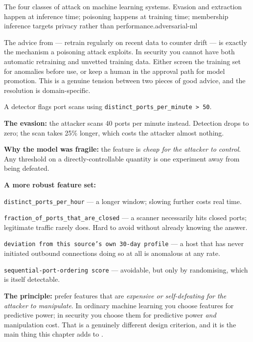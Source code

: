 {The four classes of attack on machine learning systems. Evasion and extraction happen at
inference time; poisoning happens at training time; membership inference targets privacy
rather than performance.}{adversarial-ml}

\begin{alertbox}
The advice from  --- retrain regularly on recent data to counter drift
--- is exactly the mechanism a poisoning attack exploits. In security you cannot
have both automatic retraining and unvetted training data. Either screen the
training set for anomalies before use, or keep a human in the approval path for
model promotion. This is a genuine tension between two pieces of good advice, and
the resolution is domain-specific.
\end{alertbox}

\begin{worked}
A detector flags port scans using \texttt{distinct\_ports\_per\_minute > 50}.

\smallskip
\textbf{The evasion:} the attacker scans 40 ports per minute instead. Detection
drops to zero; the scan takes 25\% longer, which costs the attacker almost nothing.

\textbf{Why the model was fragile:} the feature is \emph{cheap for the attacker to
control}. Any threshold on a directly-controllable quantity is one experiment away
from being defeated.

\smallskip
\textbf{A more robust feature set:}
\begin{tight}
  \item \texttt{distinct\_ports\_per\_hour} --- a longer window; slowing further
        costs real time.
  \item \texttt{fraction\_of\_ports\_that\_are\_closed} --- a scanner necessarily
        hits closed ports; legitimate traffic rarely does. Hard to avoid without
        already knowing the answer.
  \item \texttt{deviation from this source's own 30-day profile} --- a host that has
        never initiated outbound connections doing so at all is anomalous at any
        rate.
  \item \texttt{sequential-port-ordering score} --- avoidable, but only by
        randomising, which is itself detectable.
\end{tight}

\smallskip
\textbf{The principle:} prefer features that are \emph{expensive or self-defeating
for the attacker to manipulate}. In ordinary machine learning you choose features
for predictive power; in security you choose them for predictive power \emph{and}
manipulation cost. That is a genuinely different design criterion, and it is the
main thing this chapter adds to .
\end{worked}

